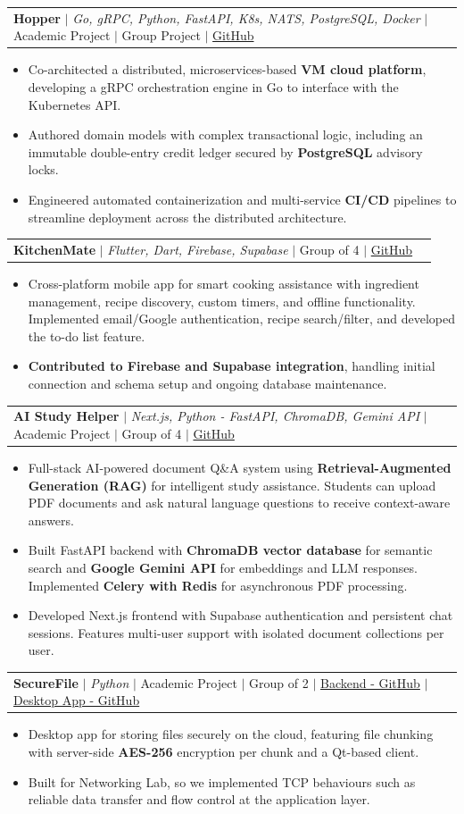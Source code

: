 \documentclass[a4paper,11pt]{article}
\makeatletter
\newcommand{\resumeItem}[1]{
  \item\small{\justifying #1 \vspace{-2pt}}
}
\newcommand{\resumeProjectHeading}[2]{
  \vspace{-2pt}\item
    \begin{tabular*}{0.97\textwidth}{l@{\extracolsep{\fill}}r}
      \small#1 & #2 \\
    \end{tabular*}\vspace{-7pt}
}
\newcommand{\resumeItemListStart}{\begin{itemize}[leftmargin=0.2in]}
\newcommand{\resumeItemListEnd}{\end{itemize}\vspace{-5pt}}
\makeatother
\begin{document}
\resumeProjectHeading
  {\textbf{Hopper} $|$ \emph{Go, gRPC, Python, FastAPI, K8s, NATS, PostgreSQL, Docker} $|$ Academic Project $|$ Group Project $|$ \href{https://github.com/crevios/hopper}{GitHub} }{}
  \resumeItemListStart
    \resumeItem{Co-architected a distributed, microservices-based \textbf{VM cloud platform}, developing a gRPC orchestration engine in Go to interface with the Kubernetes API.}
    \resumeItem{Authored domain models with complex transactional logic, including an immutable double-entry credit ledger secured by \textbf{PostgreSQL} advisory locks.}
    \resumeItem{Engineered automated containerization and multi-service \textbf{CI/CD} pipelines to streamline deployment across the distributed architecture.} 
  \resumeItemListEnd

\resumeProjectHeading
  {\textbf{KitchenMate} $|$ \emph{Flutter, Dart, Firebase, Supabase} $|$ Group of 4 $|$ \href{https://github.com/ninadgns/Android-Project-Pink-Flag}{\color{blue}GitHub}}{}
  \resumeItemListStart
    \resumeItem{Cross-platform mobile app for smart cooking assistance with ingredient management, recipe discovery, custom timers, and offline functionality. Implemented email/Google authentication, recipe search/filter, and developed the to-do list feature.}
    \resumeItem{\textbf{Contributed to Firebase and Supabase integration}, handling initial connection and schema setup and ongoing database maintenance.}
  \resumeItemListEnd

\resumeProjectHeading
  {\textbf{AI Study Helper} $|$ \emph{Next.js, Python - FastAPI, ChromaDB, Gemini API} $|$ Academic Project $|$ Group of 4 $|$ \href{https://github.com/Adha-KG/}{\color{blue}GitHub}}{}
  \resumeItemListStart
    \resumeItem{Full-stack AI-powered document Q\&A system using \textbf{Retrieval-Augmented Generation (RAG)} for intelligent study assistance. Students can upload PDF documents and ask natural language questions to receive context-aware answers.}
    \resumeItem{Built FastAPI backend with \textbf{ChromaDB vector database} for semantic search and \textbf{Google Gemini API} for embeddings and LLM responses. Implemented \textbf{Celery with Redis} for asynchronous PDF processing.}
    \resumeItem{Developed Next.js frontend with Supabase authentication and persistent chat sessions. Features multi-user support with isolated document collections per user.}
  \resumeItemListEnd

\resumeProjectHeading
  {\textbf{SecureFile} $|$ \emph{Python} $|$ Academic Project $|$ Group of 2 $|$ \href{https://github.com/mithunvoe/networking-project-backend}{Backend - GitHub} $|$ \href{https://github.com/ninadgns/networking-project-frontend}{Desktop App - GitHub} }{}
  \resumeItemListStart
    \resumeItem{Desktop app for storing files securely on the cloud, featuring file chunking with server-side \textbf{AES-256} encryption per chunk and a Qt-based client.}
    \resumeItem{Built for Networking Lab, so we implemented TCP behaviours such as reliable data transfer and flow control at the application layer.}
  \resumeItemListEnd
  
\end{document}
